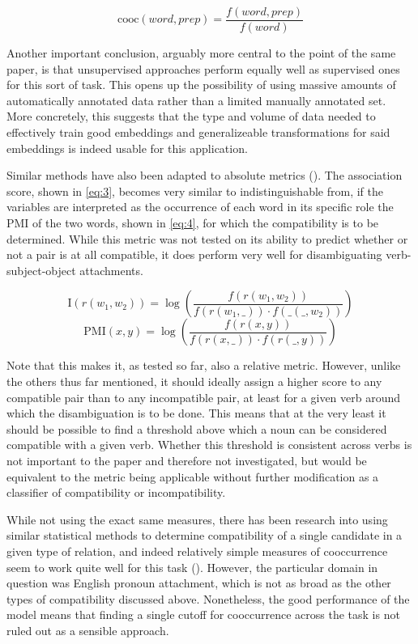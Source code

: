 \documentclass[a4paper, 12pt]{article}
\begin{document}
\begin{equation} \label{eq:2}
	\mbox{cooc}(word, prep) = \frac{f(word, prep)}{f(word)}
\end{equation}

Another important conclusion, arguably more central to the point of the same paper, is that unsupervised approaches perform equally well as supervised ones for this sort of task. This opens up the possibility of using massive amounts of automatically annotated data rather than a limited manually annotated set. More concretely, this suggests that the type and volume of data needed to effectively train good embeddings and generalizeable transformations for said embeddings is indeed usable for this application.

Similar methods have also been adapted to absolute metrics (\cite{vanNoord}). The association score, shown in \ref{eq:3}, becomes very similar to \textemdash indistinguishable from, if the variables are interpreted as the occurrence of each word in its specific role \textemdash the PMI of the two words, shown in \ref{eq:4}, for which the compatibility is to be determined. While this metric was not tested on its ability to predict whether or not a pair is at all compatible, it does perform very well for disambiguating verb-subject-object attachments.

\begin{equation} \label{eq:3}
	\mbox{I}(r(w_1, w_2)) = \log\left(\frac{f(r(w_1, w_2))}{f(r(w_1, \_ )) \cdot f(\_ (\_ , w_2))}\right)
\end{equation}
\begin{equation} \label{eq:4}
	\mbox{PMI}(x, y) = \log\left(\frac{f(r(x, y))}{f(r(x, \_ )) \cdot f(r(\_ , y))}\right)
\end{equation}

Note that this makes it, as tested so far, also a relative metric. However, unlike the others thus far mentioned, it should ideally assign a higher score to any compatible pair than to any incompatible pair, at least for a given verb around which the disambiguation is to be done. This means that at the very least it should be possible to find a threshold above which a noun can be considered compatible with a given verb. Whether this threshold is consistent across verbs is not important to the paper and therefore not investigated, but would be equivalent to the metric being applicable without further modification as a classifier of compatibility or incompatibility.

While not using the exact same measures, there has been research into using similar statistical methods to determine compatibility of a single candidate in a given type of relation, and indeed relatively simple measures of cooccurrence seem to work quite well for this task (\cite{YangSuTan}). However, the particular domain in question was English pronoun attachment, which is not as broad as the other types of compatibility discussed above. Nonetheless, the good performance of the model means that finding a single cutoff for cooccurrence across the task is not ruled out as a sensible approach.
\end{document}
